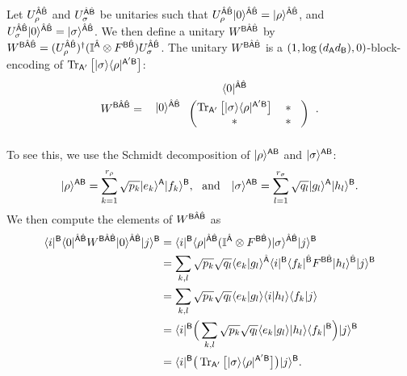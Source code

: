 Let $U_\rho^{\hat{{\mathsf{A}}}\hat{{\mathsf{B}}}}$ and $U_\sigma^{\hat{{\mathsf{A}}}\hat{{\mathsf{B}}}}$ be unitaries such that $U_\rho^{\hat{{\mathsf{A}}}\hat{{\mathsf{B}}}}|0\rangle^{\hat{{\mathsf{A}}}\hat{{\mathsf{B}}}} = |\rho\rangle^{\hat{{\mathsf{A}}}\hat{{\mathsf{B}}}}$, and $U_\sigma^{\hat{{\mathsf{A}}}\hat{{\mathsf{B}}}}|0\rangle^{\hat{{\mathsf{A}}}\hat{{\mathsf{B}}}} = |\sigma\rangle^{\hat{{\mathsf{A}}}\hat{{\mathsf{B}}}}$.
We then define a unitary $W^{{\mathsf{B}}\hat{{\mathsf{A}}}\hat{{\mathsf{B}}}}$ by $W^{{\mathsf{B}}\hat{{\mathsf{A}}}\hat{{\mathsf{B}}}} = (U_\rho^{\hat{{\mathsf{A}}}\hat{{\mathsf{B}}}})^\dag(\mathbb{I}^{\hat{{\mathsf{A}}}} \otimes F^{{\mathsf{B}}\hat{{\mathsf{B}}}})U_\sigma^{\hat{{\mathsf{A}}}\hat{{\mathsf{B}}}}$.
The unitary $W^{{\mathsf{B}}\hat{{\mathsf{A}}}\hat{{\mathsf{B}}}}$ is a $(1, \log{(d_{\mathsf{A}}d_{\mathsf{B}})}, 0)$-block-encoding of $\operatorname{Tr}_{{\mathsf{A}}'}\big[|\sigma\rangle\langle\rho|^{{\mathsf{A}}'{\mathsf{B}}}\big]$:
\begin{align}
\label{eq:block W fidelity}
        W^{\sB\hat{\sA}\hat{\sB}}
        = \hspace{1mm}
\begin{blockarray}{ccc}
& \bra{0}^{\hat{\sA}\hat{\sB}}&  & \vspace{1mm}\\
\begin{block}{c(cc)}
  \ket{0}^{\hat{\sA}\hat{\sB}} \hspace*{1mm} & \tr_{\sA'}\big[\ketbra{\sigma}{\rho}^{\sA'\sB}\big] & \hspace{0mm} * \hspace{3mm}\\
   \hspace*{1mm} & * & \hspace{0mm} * \hspace{3mm}\\
\end{block}
\end{blockarray}\hspace{2.5mm}.
\end{align}
To see this, we use the Schmidt decomposition of $|\rho\rangle^{{\mathsf{A}}{\mathsf{B}}}$ and $|\sigma\rangle^{{\mathsf{A}}{\mathsf{B}}}$:
\begin{align}
      \ket{\rho}^{\sA\sB} = \sum_{k=1}^{r_\rho}\sqrt{p_k}\ket{e_k}^\sA\ket{f_k}^\sB, \ \ \text{and} \ \ \ 
      \ket{\sigma}^{\sA\sB} = \sum_{l=1}^{r_\sigma}\sqrt{q_l}\ket{g_l}^\sA\ket{h_l}^\sB.
\end{align}
We then compute the elements of $W^{{\mathsf{B}}\hat{{\mathsf{A}}}\hat{{\mathsf{B}}}}$ as
\begin{align}
    \langle i|^{\mathsf{B}}\langle0|^{\hat{{\mathsf{A}}}\hat{{\mathsf{B}}}}W^{{\mathsf{B}}\hat{{\mathsf{A}}}\hat{{\mathsf{B}}}}|0\rangle^{\hat{{\mathsf{A}}}\hat{{\mathsf{B}}}}|j\rangle^{{\mathsf{B}}}
    &=  \langle i|^{\mathsf{B}}\langle\rho|^{\hat{{\mathsf{A}}}\hat{{\mathsf{B}}}}(\mathbb{I}^{\hat{{\mathsf{A}}}} \otimes F^{{\mathsf{B}}\hat{{\mathsf{B}}}})|\sigma\rangle^{\hat{{\mathsf{A}}}\hat{{\mathsf{B}}}}|j\rangle^{{\mathsf{B}}} \\
    &= \sum_{k, l} \sqrt{p_k}\sqrt{q_l}\langle e_k \vert g_l \rangle^{\hat{{\mathsf{A}}}} \langle i|^{\mathsf{B}}\langle f_k|^{\hat{{\mathsf{B}}}} F^{{\mathsf{B}}\hat{{\mathsf{B}}}} |h_l\rangle^{\hat{{\mathsf{B}}}}|j\rangle^{\mathsf{B}} \\
    &= \sum_{k, l} \sqrt{p_k}\sqrt{q_l}\langle e_k \vert g_l \rangle\langle i \vert h_l \rangle\langle f_k \vert j \rangle \\
    &= \langle i|^{\mathsf{B}} \Big(\sum_{k, l} \sqrt{p_k}\sqrt{q_l}\langle e_k \vert g_l \rangle|h_l\rangle\langle f_k|^{\mathsf{B}} \Big) |j\rangle^{\mathsf{B}} \\
    \label{inteq:171}
    &= \langle i|^{\mathsf{B}} \big(\operatorname{Tr}_{{\mathsf{A}}'}\big[|\sigma\rangle\langle\rho|^{{\mathsf{A}}'{\mathsf{B}}}\big]\big) |j\rangle^{\mathsf{B}}.
\end{align}
